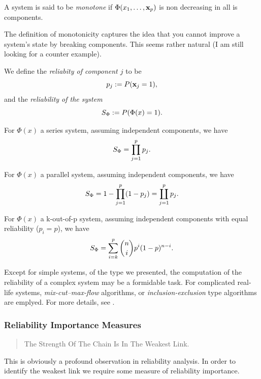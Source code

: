 \begin{definition}
A system is said to be \emph{monotone} if $\Phi(x_1,\dots,\mathbf{x}_p)$ is non decreasing in all is components.
\end{definition}
The definition of monotonicity captures the idea that you cannot improve a system's state by breaking components.
This seems rather natural (I am still looking for a counter example).






\begin{definition}[Reliability]
We define the \emph{reliabity of component $j$} to be $$p_j:= P(\mathbf{x}_j=1),$$ 
and  the \emph{reliability of the system} 
$$ S_\Phi:=P(\Phi(x)=1).$$
\end{definition}


\begin{example}
For $\Phi(x)$ a series system, assuming independent components, we have
$$ S_\Phi= \prod_{j=1}^{p} p_j.$$
\end{example}


\begin{example}
For $\Phi(x)$ a parallel system, assuming independent components, we have
$$ S_\Phi= 1-\prod_{j=1}^{p} (1-p_j)= \coprod_{j=1}^p p_j. $$
\end{example}


\begin{example}
For $\Phi(x)$ a k-out-of-p system, assuming independent components with equal reliability ($p_i=p$), we have
$$ S_\Phi= \sum_{i=k}^{p} \binom{n}{i} p^i (1-p)^{n-i} .$$
\end{example}


\begin{extra}
Except for simple systems, of the type we presented, the computation of the reliability of a complex system may be a formidable task. 
For complicated real-life systems, \emph{mix-cut--max-flow} algorithms, or \emph{inclusion-exclusion} type algorithms are emplyed. 
For more details, see \cite{aven_stochastic_1999}.
\end{extra}









\subsubsection{Reliability Importance Measures}
\begin{quotation}
The Strength Of The Chain Is In The Weakest Link.
\end{quotation}
This is obviously a profound observation in reliability analysis.
In order to identify the weakest link we require some measure of reliability importance.


